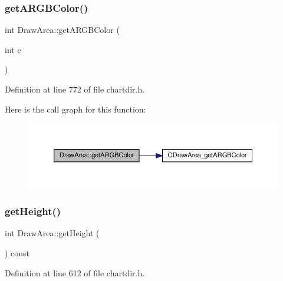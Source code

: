 \subsubsection{\texorpdfstring{get\+A\+R\+G\+B\+Color()}{getARGBColor()}}
{\footnotesize\ttfamily int Draw\+Area\+::get\+A\+R\+G\+B\+Color (\begin{DoxyParamCaption}\item[{int}]{c }\end{DoxyParamCaption})\hspace{0.3cm}{\ttfamily [inline]}}



Definition at line 772 of file chartdir.\+h.

Here is the call graph for this function\+:
\nopagebreak
\begin{figure}[H]
\begin{center}
\leavevmode
\includegraphics[width=350pt]{class_draw_area_a5636e0e893a7c9a40f76a3564bd59db9_cgraph}
\end{center}
\end{figure}
\mbox{\label{class_draw_area_a1245dcb3b871d15bf9e135302d7ba98f}} 
\subsubsection{\texorpdfstring{get\+Height()}{getHeight()}}
{\footnotesize\ttfamily int Draw\+Area\+::get\+Height (\begin{DoxyParamCaption}{ }\end{DoxyParamCaption}) const\hspace{0.3cm}{\ttfamily [inline]}}



Definition at line 612 of file chartdir.\+h.

